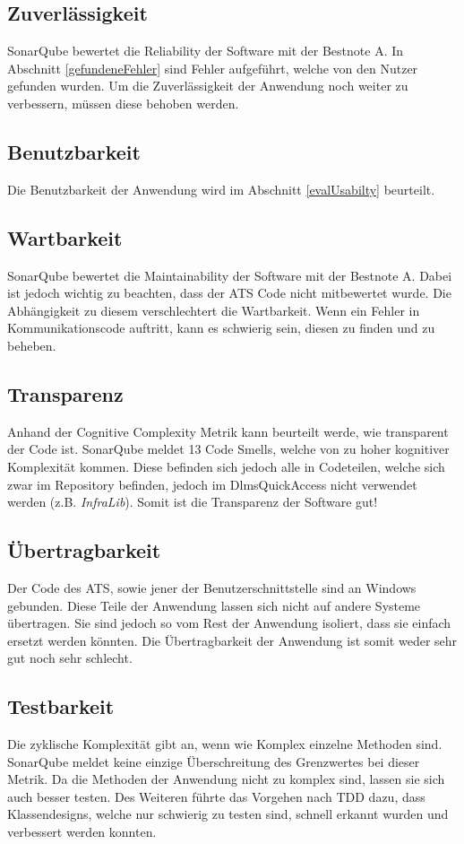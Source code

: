 \subsection{Zuverlässigkeit}
SonarQube bewertet die Reliability der Software mit der Bestnote \dq A\dq.
In Abschnitt \ref{gefundeneFehler} sind Fehler aufgeführt, welche von den Nutzer gefunden wurden.
Um die Zuverlässigkeit der Anwendung noch weiter zu verbessern, müssen diese behoben werden.

\subsection{Benutzbarkeit}
Die Benutzbarkeit der Anwendung wird im Abschnitt \ref{evalUsabilty} beurteilt.

\subsection{Wartbarkeit}
SonarQube bewertet die Maintainability der Software mit der Bestnote \dq A\dq.
Dabei ist jedoch wichtig zu beachten, dass der \ac{ATS} Code nicht mitbewertet wurde.
Die Abhängigkeit zu diesem verschlechtert die Wartbarkeit.
Wenn ein Fehler in Kommunikationscode auftritt, kann es schwierig sein, diesen zu finden und zu beheben.

\subsection{Transparenz}
Anhand der Cognitive Complexity Metrik kann beurteilt werde, wie transparent der Code ist.
SonarQube meldet 13 Code Smells, welche von zu hoher kognitiver Komplexität kommen.
Diese befinden sich jedoch alle in Codeteilen, welche sich zwar im Repository befinden, jedoch im DlmsQuickAccess nicht verwendet werden (z.B. \textit{InfraLib}).
Somit ist die Transparenz der Software gut!

\subsection{Übertragbarkeit}
Der Code des \ac{ATS}, sowie jener der Benutzerschnittstelle sind an Windows gebunden.
Diese Teile der Anwendung lassen sich nicht auf andere Systeme übertragen.
Sie sind jedoch so vom Rest der Anwendung isoliert, dass sie einfach ersetzt werden könnten.
Die Übertragbarkeit der Anwendung ist somit weder sehr gut noch sehr schlecht.

\subsection{Testbarkeit}
Die zyklische Komplexität gibt an, wenn wie Komplex einzelne Methoden sind.
SonarQube meldet keine einzige Überschreitung des Grenzwertes bei dieser Metrik.
Da die Methoden der Anwendung nicht zu komplex sind, lassen sie sich auch besser testen.
Des Weiteren führte das Vorgehen nach \ac{TDD} dazu, dass Klassendesigns, welche nur schwierig zu testen sind, schnell erkannt wurden und verbessert werden konnten.


